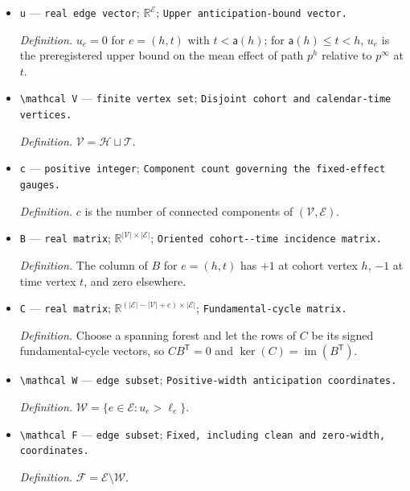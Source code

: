 \documentclass{article}
\begin{document}
\begin{itemize}
  \item \texttt{u} --- \texttt{real edge vector}; \(\mathbb R^{\mathcal E}\); \texttt{Upper anticipation-\allowbreak{}bound vector.}
  \par\smallskip\noindent\emph{Definition.} \(u_e=0\) for \(e=(h,t)\) with \(t<\mathsf a(h)\); for \(\mathsf a(h)\le t<h\), \(u_e\) is the preregistered upper bound on the mean effect of path \(p^h\) relative to \(p^\infty\) at \(t\).
  \item \texttt{\textbackslash{}\allowbreak{}mathcal V} --- \texttt{finite vertex set}; \texttt{Disjoint cohort and calendar-\allowbreak{}time vertices.}
  \par\smallskip\noindent\emph{Definition.} \(\mathcal V=\mathcal H\sqcup\mathcal T\).
  \item \texttt{c} --- \texttt{positive integer}; \texttt{Component count governing the fixed-\allowbreak{}effect gauges.}
  \par\smallskip\noindent\emph{Definition.} \(c\) is the number of connected components of \((\mathcal V,\mathcal E)\).
  \item \texttt{B} --- \texttt{real matrix}; \(\mathbb R^{|\mathcal V|\times|\mathcal E|}\); \texttt{Oriented cohort-\allowbreak{}-\allowbreak{}time incidence matrix.}
  \par\smallskip\noindent\emph{Definition.} The column of \(B\) for \(e=(h,t)\) has \(+1\) at cohort vertex \(h\), \(-1\) at time vertex \(t\), and zero elsewhere.
  \item \texttt{C} --- \texttt{real matrix}; \(\mathbb R^{(|\mathcal E|-|\mathcal V|+c)\times|\mathcal E|}\); \texttt{Fundamental-\allowbreak{}cycle matrix.}
  \par\smallskip\noindent\emph{Definition.} Choose a spanning forest and let the rows of \(C\) be its signed fundamental-cycle vectors, so \(CB^{\mathsf T}=0\) and \(\ker(C)=\operatorname{im}(B^{\mathsf T})\).
  \item \texttt{\textbackslash{}\allowbreak{}mathcal W} --- \texttt{edge subset}; \texttt{Positive-\allowbreak{}width anticipation coordinates.}
  \par\smallskip\noindent\emph{Definition.} \(\mathcal W=\{e\in\mathcal E:u_e>\ell_e\}\).
  \item \texttt{\textbackslash{}\allowbreak{}mathcal F} --- \texttt{edge subset}; \texttt{Fixed,\allowbreak{} including clean and zero-\allowbreak{}width,\allowbreak{} coordinates.}
  \par\smallskip\noindent\emph{Definition.} \(\mathcal F=\mathcal E\setminus\mathcal W\).

\end{itemize}
\end{document}
